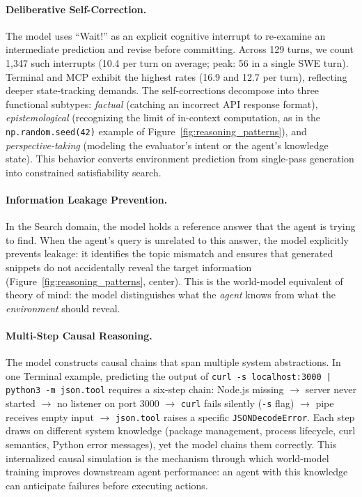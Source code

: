 \paragraph{Deliberative Self-Correction.}
The model uses ``Wait!'' as an explicit cognitive interrupt to re-examine an intermediate prediction and revise before committing.
Across 129 turns, we count 1{,}347 such interrupts (10.4 per turn on average; peak: 56 in a single SWE turn).
Terminal and MCP exhibit the highest rates (16.9 and 12.7 per turn), reflecting deeper state-tracking demands.
The self-corrections decompose into three functional subtypes:
\emph{factual} (catching an incorrect API response format),
\emph{epistemological} (recognizing the limit of in-context computation, as in the \texttt{np.random.seed(42)} example of Figure~\ref{fig:reasoning_patterns}), and
\emph{perspective-taking} (modeling the evaluator's intent or the agent's knowledge state).
This behavior converts environment prediction from single-pass generation into constrained satisfiability search.

\paragraph{Information Leakage Prevention.}
In the Search domain, the model holds a reference answer that the agent is trying to find.
When the agent's query is unrelated to this answer, the model explicitly prevents leakage: it identifies the topic mismatch and ensures that generated snippets do not accidentally reveal the target information (Figure~\ref{fig:reasoning_patterns}, center).
This is the world-model equivalent of theory of mind: the model distinguishes what the \emph{agent} knows from what the \emph{environment} should reveal.

\paragraph{Multi-Step Causal Reasoning.}
The model constructs causal chains that span multiple system abstractions.
In one Terminal example, predicting the output of \texttt{curl -s localhost:3000 | python3 -m json.tool} requires a six-step chain: Node.js missing $\to$ server never started $\to$ no listener on port 3000 $\to$ \texttt{curl} fails silently (\texttt{-s} flag) $\to$ pipe receives empty input $\to$ \texttt{json.tool} raises a specific \texttt{JSONDecodeError}.
Each step draws on different system knowledge (package management, process lifecycle, curl semantics, Python error messages), yet the model chains them correctly.
This internalized causal simulation is the mechanism through which world-model training improves downstream agent performance: an agent with this knowledge can anticipate failures before executing actions.

